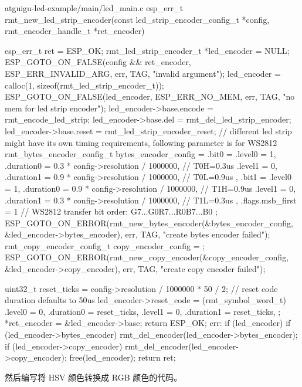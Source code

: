 \documentclass[lang=cn,newtx,10pt,scheme=chinese]{elegantbook}
\begin{document}
\begin{mycode}{atguigu-led-example/main/led\_main.c}
esp_err_t rmt_new_led_strip_encoder(const led_strip_encoder_config_t *config, rmt_encoder_handle_t *ret_encoder)
{
    esp_err_t ret = ESP_OK;
    rmt_led_strip_encoder_t *led_encoder = NULL;
    ESP_GOTO_ON_FALSE(config && ret_encoder, ESP_ERR_INVALID_ARG, err, TAG, "invalid argument");
    led_encoder = calloc(1, sizeof(rmt_led_strip_encoder_t));
    ESP_GOTO_ON_FALSE(led_encoder, ESP_ERR_NO_MEM, err, TAG, "no mem for led strip encoder");
    led_encoder->base.encode = rmt_encode_led_strip;
    led_encoder->base.del = rmt_del_led_strip_encoder;
    led_encoder->base.reset = rmt_led_strip_encoder_reset;
    // different led strip might have its own timing requirements, following parameter is for WS2812
    rmt_bytes_encoder_config_t bytes_encoder_config = {
        .bit0 = {
            .level0 = 1,
            .duration0 = 0.3 * config->resolution / 1000000, // T0H=0.3us
            .level1 = 0,
            .duration1 = 0.9 * config->resolution / 1000000, // T0L=0.9us
        },
        .bit1 = {
            .level0 = 1,
            .duration0 = 0.9 * config->resolution / 1000000, // T1H=0.9us
            .level1 = 0,
            .duration1 = 0.3 * config->resolution / 1000000, // T1L=0.3us
        },
        .flags.msb_first = 1 // WS2812 transfer bit order: G7...G0R7...R0B7...B0
    };
    ESP_GOTO_ON_ERROR(rmt_new_bytes_encoder(&bytes_encoder_config, &led_encoder->bytes_encoder), err, TAG, "create bytes encoder failed");
    rmt_copy_encoder_config_t copy_encoder_config = {};
    ESP_GOTO_ON_ERROR(rmt_new_copy_encoder(&copy_encoder_config, &led_encoder->copy_encoder), err, TAG, "create copy encoder failed");

    uint32_t reset_ticks = config->resolution / 1000000 * 50 / 2; // reset code duration defaults to 50us
    led_encoder->reset_code = (rmt_symbol_word_t){
        .level0 = 0,
        .duration0 = reset_ticks,
        .level1 = 0,
        .duration1 = reset_ticks,
    };
    *ret_encoder = &led_encoder->base;
    return ESP_OK;
err:
    if (led_encoder)
    {
        if (led_encoder->bytes_encoder)
        {
            rmt_del_encoder(led_encoder->bytes_encoder);
        }
        if (led_encoder->copy_encoder)
        {
            rmt_del_encoder(led_encoder->copy_encoder);
        }
        free(led_encoder);
    }
    return ret;
}
\end{mycode}

然后编写将 HSV 颜色转换成 RGB 颜色的代码。
\end{document}
